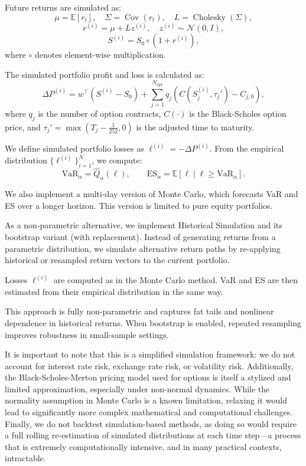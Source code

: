 \documentclass[12pt]{article}
\begin{document}
Future returns are simulated as:
\[
\mu = \mathbb{E}[r_t], \quad \Sigma = \operatorname{Cov}(r_t), \quad L = \operatorname{Cholesky}(\Sigma),
\]
\[
r^{(i)} = \mu + L z^{(i)}, \quad z^{(i)} \sim \mathcal{N}(0, I),
\]
\[
S^{(i)} = S_0 \circ (1 + r^{(i)}),
\]
where \( \circ \) denotes element-wise multiplication.

The simulated portfolio profit and loss is calculated as:
\[
\Delta P^{(i)} = w^\top(S^{(i)} - S_0) + \sum_{j=1}^{N_{\mathrm{opt}}} q_j \left(C(S_j^{(i)}, \tau_j') - C_{j,0}\right),
\]
where \( q_j \) is the number of option contracts, \( C(\cdot) \) is the Black-Scholes option price, and \( \tau_j' = \max(T_j - \tfrac{1}{252}, 0) \) is the adjusted time to maturity.

We define simulated portfolio losses as \( \ell^{(i)} = -\Delta P^{(i)} \). From the empirical distribution \( \{\ell^{(i)}\}_{i=1}^N \), we compute:
\[
\text{VaR}_\alpha = \widehat{Q}_\alpha(\ell), \qquad
\text{ES}_\alpha = \mathbb{E}[\ell \mid \ell \ge \text{VaR}_\alpha].
\]

We also implement a multi-day version of Monte Carlo, which forecasts VaR and ES over a longer horizon. This version is limited to pure equity portfolios.

As a non-parametric alternative, we implement Historical Simulation and its bootstrap variant (with replacement). Instead of generating returns from a parametric distribution, we simulate alternative return paths by re-applying historical or resampled return vectors to the current portfolio.

Losses \( \ell^{(i)} \) are computed as in the Monte Carlo method. VaR and ES are then estimated from their empirical distribution in the same way.

This approach is fully non-parametric and captures fat tails and nonlinear dependence in historical returns. When bootstrap is enabled, repeated resampling improves robustness in small-sample settings.


It is important to note that this is a simplified simulation framework: we do not account for interest rate risk, exchange rate risk, or volatility risk. Additionally, the Black-Scholes-Merton pricing model used for options is itself a stylized and limited approximation, especially under non-normal dynamics. While the normality assumption in Monte Carlo is a known limitation, relaxing it would lead to significantly more complex mathematical and computational challenges. Finally, we do not backtest simulation-based methods, as doing so would require a full rolling re-estimation of simulated distributions at each time step—a process that is extremely computationally intensive, and in many practical contexts, intractable.
\end{document}
